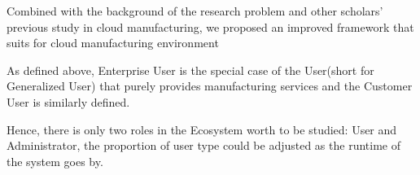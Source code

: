 Combined with the background of the research problem and other scholars' previous study in cloud manufacturing, we proposed an improved framework that suits for cloud manufacturing environment



As defined above, Enterprise User is the special case of the User(short for Generalized User) that purely provides manufacturing services and the Customer User is similarly defined.

Hence, there is only two roles in the Ecosystem worth to be studied: User and Administrator, the proportion of user type could be adjusted as the runtime of the system goes by.



